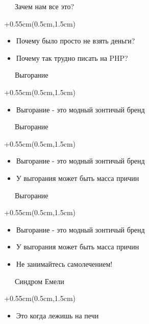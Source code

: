 \documentclass[xetex,18pt,aspectratio=169]{beamer}
\begin{document}
\begin{Large}
\begin{frame}{\ \ \ Зачем нам все это?}
\begin{textblock*}{\framewidth+0.55cm}(0.5cm,1.5cm)
\begin{itemize}
  \item Почему было просто не взять деньги?
  \item Почему так трудно писать на PHP?
\end{itemize}
\end{textblock*}
\end{frame}

\begin{frame}{\ \ \ Выгорание}
\begin{textblock*}{\framewidth+0.55cm}(0.5cm,1.5cm)
\begin{itemize}
  \item Выгорание - это модный зонтичый бренд
\end{itemize}
\end{textblock*}
\end{frame}

\begin{frame}{\ \ \ Выгорание}
\begin{textblock*}{\framewidth+0.55cm}(0.5cm,1.5cm)
\begin{itemize}
  \item Выгорание - это модный зонтичый бренд
  \item У выгорания может быть масса причин
\end{itemize}
\end{textblock*}
\end{frame}

\begin{frame}{\ \ \ Выгорание}
\begin{textblock*}{\framewidth+0.55cm}(0.5cm,1.5cm)
\begin{itemize}
  \item Выгорание - это модный зонтичый бренд
  \item У выгорания может быть масса причин
  \item Не занимайтесь самолечением!
\end{itemize}
\end{textblock*}
\end{frame}

\begin{frame}{\ \ \ Синдром Емели}
\begin{textblock*}{\framewidth+0.55cm}(0.5cm,1.5cm)
\begin{itemize}
  \item Это когда лежишь на печи
\end{itemize}
\end{textblock*}
\end{frame}


\end{Large}
\end{document}
